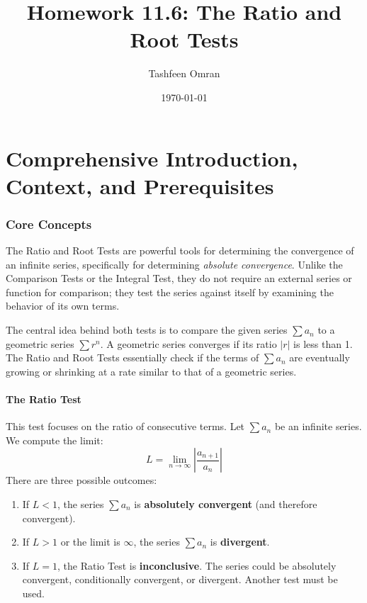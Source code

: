 \documentclass{article}
\title{Homework 11.6: The Ratio and Root Tests}
\author{Tashfeen Omran}
\date{\today}
\begin{document}
\maketitle

\part{Comprehensive Introduction, Context, and Prerequisites}

\section{Core Concepts}
The Ratio and Root Tests are powerful tools for determining the convergence of an infinite series, specifically for determining \textit{absolute convergence}. Unlike the Comparison Tests or the Integral Test, they do not require an external series or function for comparison; they test the series against itself by examining the behavior of its own terms.

The central idea behind both tests is to compare the given series $\sum a_n$ to a geometric series $\sum r^n$. A geometric series converges if its ratio $|r|$ is less than 1. The Ratio and Root Tests essentially check if the terms of $\sum a_n$ are eventually growing or shrinking at a rate similar to that of a geometric series.

\subsection{The Ratio Test}
This test focuses on the ratio of consecutive terms. Let $\sum a_n$ be an infinite series. We compute the limit:
\[ L = \lim_{n \to \infty} \left| \frac{a_{n+1}}{a_n} \right| \]
There are three possible outcomes:
\begin{enumerate}
    \item If $L < 1$, the series $\sum a_n$ is \textbf{absolutely convergent} (and therefore convergent).
    \item If $L > 1$ or the limit is $\infty$, the series $\sum a_n$ is \textbf{divergent}.
    \item If $L = 1$, the Ratio Test is \textbf{inconclusive}. The series could be absolutely convergent, conditionally convergent, or divergent. Another test must be used.
\end{enumerate}
\end{document}
